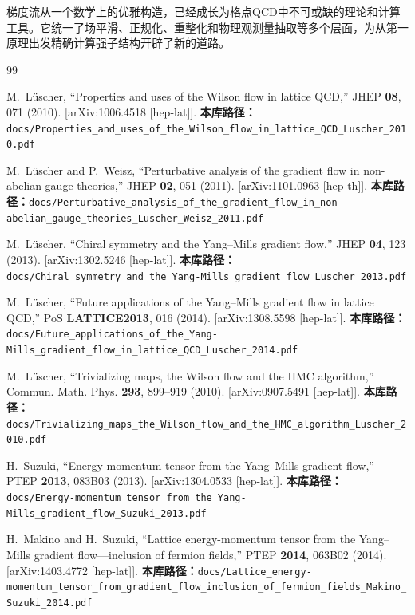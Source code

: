 \documentclass[12pt,a4paper]{ctexart}
\theoremstyle{definition}
\begin{document}
梯度流从一个数学上的优雅构造，已经成长为格点QCD中不可或缺的理论和计算工具。它统一了场平滑、正规化、重整化和物理观测量抽取等多个层面，为从第一原理出发精确计算强子结构开辟了新的道路。


\begin{thebibliography}{99}

M.~L\"uscher,
``Properties and uses of the Wilson flow in lattice QCD,''
JHEP \textbf{08}, 071 (2010).
[arXiv:1006.4518 [hep-lat]].
\textbf{本库路径：}\texttt{docs/Properties\_and\_uses\_of\_the\_Wilson\_flow\_in\_lattice\_QCD\_Luscher\_2010.pdf}

M.~L\"uscher and P.~Weisz,
``Perturbative analysis of the gradient flow in non-abelian gauge theories,''
JHEP \textbf{02}, 051 (2011).
[arXiv:1101.0963 [hep-th]].
\textbf{本库路径：}\texttt{docs/Perturbative\_analysis\_of\_the\_gradient\_flow\_in\_non-abelian\_gauge\_theories\_Luscher\_Weisz\_2011.pdf}

M.~L\"uscher,
``Chiral symmetry and the Yang--Mills gradient flow,''
JHEP \textbf{04}, 123 (2013).
[arXiv:1302.5246 [hep-lat]].
\textbf{本库路径：}\texttt{docs/Chiral\_symmetry\_and\_the\_Yang-Mills\_gradient\_flow\_Luscher\_2013.pdf}

M.~L\"uscher,
``Future applications of the Yang--Mills gradient flow in lattice QCD,''
PoS \textbf{LATTICE2013}, 016 (2014).
[arXiv:1308.5598 [hep-lat]].
\textbf{本库路径：}\texttt{docs/Future\_applications\_of\_the\_Yang-Mills\_gradient\_flow\_in\_lattice\_QCD\_Luscher\_2014.pdf}

M.~L\"uscher,
``Trivializing maps, the Wilson flow and the HMC algorithm,''
Commun. Math. Phys. \textbf{293}, 899--919 (2010).
[arXiv:0907.5491 [hep-lat]].
\textbf{本库路径：}\texttt{docs/Trivializing\_maps\_the\_Wilson\_flow\_and\_the\_HMC\_algorithm\_Luscher\_2010.pdf}

H.~Suzuki,
``Energy-momentum tensor from the Yang--Mills gradient flow,''
PTEP \textbf{2013}, 083B03 (2013).
[arXiv:1304.0533 [hep-lat]].
\textbf{本库路径：}\texttt{docs/Energy-momentum\_tensor\_from\_the\_Yang-Mills\_gradient\_flow\_Suzuki\_2013.pdf}

H.~Makino and H.~Suzuki,
``Lattice energy-momentum tensor from the Yang--Mills gradient flow---inclusion of fermion fields,''
PTEP \textbf{2014}, 063B02 (2014).
[arXiv:1403.4772 [hep-lat]].
\textbf{本库路径：}\texttt{docs/Lattice\_energy-momentum\_tensor\_from\_gradient\_flow\_inclusion\_of\_fermion\_fields\_Makino\_Suzuki\_2014.pdf}


\end{thebibliography}
\end{document}
